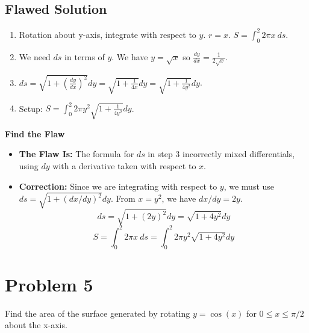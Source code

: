 \documentclass{article}
\begin{document}
\subsection{Flawed Solution}
\begin{enumerate}
    \item Rotation about y-axis, integrate with respect to \(y\). \(r=x\). \(S = \int_0^2 2\pi x \ ds\).
    \item We need \(ds\) in terms of \(y\). We have \(y=\sqrt{x}\) so \(\frac{dy}{dx} = \frac{1}{2\sqrt{x}}\).
    \item \(ds = \sqrt{1+(\frac{dy}{dx})^2} dy = \sqrt{1+\frac{1}{4x}} dy = \sqrt{1+\frac{1}{4y^2}} dy\).
    \item Setup: \(S = \int_0^2 2\pi y^2 \sqrt{1+\frac{1}{4y^2}} dy\).
\end{enumerate}
\textbf{Find the Flaw}
\begin{itemize}
    \item \textbf{The Flaw Is:} The formula for \(ds\) in step 3 incorrectly mixed differentials, using \(dy\) with a derivative taken with respect to \(x\).
    \item \textbf{Correction:} Since we are integrating with respect to \(y\), we must use \(ds = \sqrt{1+(dx/dy)^2} dy\). From \(x=y^2\), we have \(dx/dy = 2y\).
    \[ ds = \sqrt{1+(2y)^2} dy = \sqrt{1+4y^2} dy \]
    \[ S = \int_0^2 2\pi x \ ds = \int_0^2 2\pi y^2 \sqrt{1+4y^2} dy \]
\end{itemize}

\section{Problem 5}
Find the area of the surface generated by rotating \(y=\cos(x)\) for \(0 \le x \le \pi/2\) about the x-axis.
\end{document}
